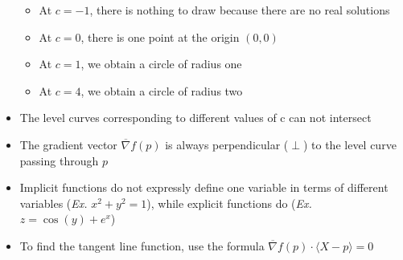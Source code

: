 \begin{itemize}
    \begin{itemize}

      \item At $c=-1$, there is nothing to draw because there are no real solutions

      \item At $c=0$, there is one point at the origin $(0,0)$

      \item At $c=1$, we obtain a circle of radius one

      \item At $c=4$, we obtain a circle of radius two

    \end{itemize}

  \item The level curves corresponding to different values of c can not intersect

  \item The gradient vector $\overline{\nabla} f(p)$ is always perpendicular ($\perp$) to the level curve passing through $p$

  \item Implicit functions do not expressly define one variable in terms of different variables (\textit{Ex.} $x^2+y^2=1$), while explicit functions do (\textit{Ex.} $z=\cos(y)+e^x$)

  \item To find the tangent line function, use the formula $\overline{\nabla} f(p) \cdot \langle X - p\rangle = 0$

\end{itemize}



